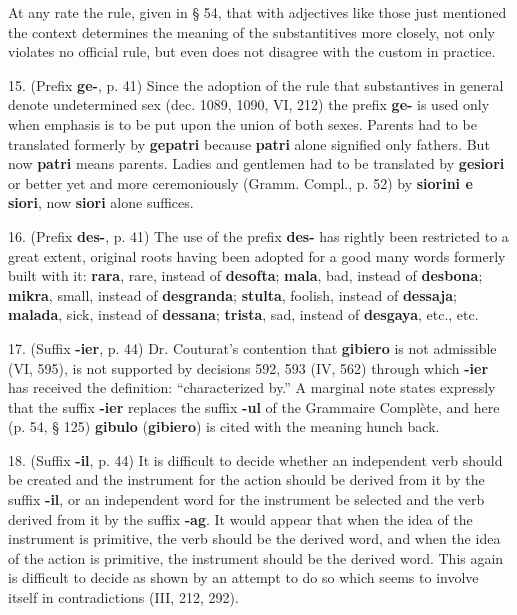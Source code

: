 At any rate the rule, given in § 54, that with adjectives like those just mentioned the context determines the meaning of the substantitives more closely, not only violates no official rule, but even does not disagree with the custom in practice.\footnotemark[1]

15. (Prefix \textbf{ge-}, p. 41) Since the adoption of the rule that substantives in general denote undetermined sex (dec. 1089, 1090, VI, 212) the prefix \textbf{ge-} is used only when emphasis is to be put upon the union of both sexes. Parents had to be translated formerly by \textbf{gepatri} because \textbf{patri} alone signified only fathers. But now \textbf{patri} means parents. Ladies and gentlemen had to be translated by \textbf{gesiori} or better yet and more ceremoniously (Gramm. Compl., p. 52) by \textbf{siorini e siori}, now \textbf{siori} alone suffices.

16. (Prefix \textbf{des-}, p. 41) The use of the prefix \textbf{des-} has rightly been restricted to a great extent, original roots having been adopted for a good many words formerly built with it: \textbf{rara}, rare, instead of \textbf{desofta}; \textbf{mala}, bad, instead of \textbf{desbona}; \textbf{mikra}, small, instead of \textbf{desgranda}; \textbf{stulta}, foolish, instead of \textbf{dessaja}; \textbf{malada}, sick, instead of \textbf{dessana}; \textbf{trista}, sad, instead of \textbf{desgaya}, etc., etc.

17. (Suffix \textbf{-ier}, p. 44) Dr. Couturat's contention that \textbf{gibiero} is not admissible (VI, 595), is not supported by decisions 592, 593 (IV, 562) through which \textbf{-ier} has received the definition: ``characterized by.'' A marginal note states expressly that the suffix \textbf{-ier} replaces the suffix \textbf{-ul} of the Grammaire Complète, and here (p. 54, § 125) \textbf{gibulo} (\textbf{gibiero}) is cited with the meaning hunch back.

18. (Suffix \textbf{-il}, p. 44) It is difficult to decide whether an independent verb should be created and the instrument for the action should be derived from it by the suffix \textbf{-il}, or an independent word for the instrument be selected and the verb derived from it by the suffix \textbf{-ag}. It would appear that when the idea of the instrument is primitive, the verb should be the derived word, and when the idea of the action is primitive, the instrument should be the derived word. This again is difficult to decide as shown by an attempt to do so which seems to involve itself in contradictions (III, 212, 292).

